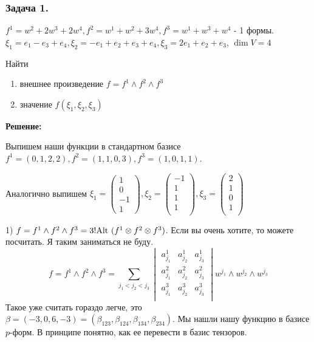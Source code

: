 \subsubsection{Задача 1.}

$f^1 = w^2 + 2w^3 + 2w^4, f^2 = w^1 + w^2 + 3w^4, f^3 = w^1 + w^3 + w^4$ - 1 формы. $\xi_1 = e_1-e_3 + e_4, \xi_2 =-e_1 + e_2 + e_3 + e_4,\xi_3 = 2e_1 + e_2 + e_3$, $\dim V =4$

Найти
\begin{enumerate}
    \item внешнее произведение $f = f^1 \wedge f^2 \wedge f^3$
    \item значение $f(\xi_1,\xi_2,\xi_3)$
\end{enumerate}

\textbf{Решение:}

Выпишем наши функции в стандартном базисе $f^1 = (0,1,2,2), f^2 = (1,1,0,3), f^3 = (1,0,1,1)$.

Аналогично выпишем $\xi_1= \begin{pmatrix}
    1 \\
    0\\
    -1\\
    1
\end{pmatrix}, \xi_2 = \begin{pmatrix}
    -1 \\
    1 \\
    1 \\
    1\\
\end{pmatrix}, \xi_3 =\begin{pmatrix}
    2\\
    1\\
    0\\
    1\\
\end{pmatrix}$

1) $f=f^1 \wedge f^2 \wedge f^3 = 3! \text{Alt }(f^1 \otimes f^2 \otimes f^3)$. Если вы очень хотите, то можете посчитать. Я таким заниматься не буду. 
$$f = f^1 \wedge f^2 \wedge f^3 = \sum\limits_{j_1<j_2<j_3}\begin{vmatrix}
    a^1_{j_1} & a^1_{j_2} & a^1_{j_3}\\
    a_{j_1}^2 & a^2_{j_2} & a^2_{j_3}\\
     a^3_{j_1} & a^3_{j_2} & a^3_{j_3}\\
\end{vmatrix} w^{j_1}\wedge w^{j_2}\wedge w^{j_3}$$
Такое уже считать гораздо легче, это $\beta = (-3,0,6,-3)  = (\beta_{123}, \beta_{124},\beta_{134},\beta_{234})$. Мы нашли нашу функцию в базисе $p$-форм. В принципе понятно, как ее перевести в базис тензоров.

